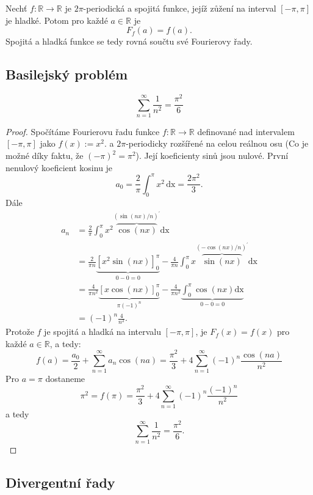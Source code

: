 \documentclass[../main.tex]{subfiles}
\begin{document}
\begin{consequence}
    Nechť $f:\mathbb{R}\to\mathbb{R}$ je $2\pi$-periodická a spojitá funkce, jejíž
    zůžení na interval $[-\pi,\pi]$ je hladké. Potom pro každé $a\in\mathbb{R}$ je
    \[ F_f(a) = f(a). \]
    Spojitá a hladká funkce se tedy rovná součtu své Fourierovy řady.
\end{consequence}

\subsection{Basilejský problém}

\begin{theorem}
    \[ \sum_{n=1}^{\infty} \frac{1}{n^2} = \frac{\pi^2}{6} \]
\end{theorem}
\begin{proof}
    Spočítáme Fourierovu řadu funkce $f:\mathbb{R}\to\mathbb{R}$ definované nad intervalem $[-\pi,\pi]$ jako
    $f(x) := x^2$. a $2\pi$-periodicky rozšířené na celou reálnou osu (Co je možné díky faktu, že $(-\pi)^2 = \pi^2$).
    Její koeficienty sinů jsou nulové. První nenulový koeficient kosinu je
    \[ a_0 = \frac{2}{\pi}\int_{0}^{\pi}x^2\,\text{dx} = \frac{2\pi^2}{3}.\]
    Dále
    $$
    \begin{aligned}
    a_n & =\frac{2}{\pi} \int_0^\pi x^2 \overbrace{\cos (n x)}^{(\sin (n x) / n)^{\prime}} \mathrm{dx} \\
    & =\frac{2}{\pi n} \underbrace{\left[x^2 \sin (n x)\right]_0^\pi}_{0-0=0}-\frac{4}{\pi n} \int_0^\pi x \overbrace{\sin (n x)}^{(-\cos (n x) / n)^{\prime}} \mathrm{dx} \\
    & =\frac{4}{\pi n^2} \underbrace{[x \cos (n x)]_0^\pi}_{\pi(-1)^n}-\frac{4}{\pi n^2} \underbrace{\int_0^\pi \cos (n x) \mathrm{dx}}_{0-0=0} \\
    & =(-1)^n \frac{4}{n^2} .
    \end{aligned}
    $$
    Protože $f$ je spojitá a hladká na intervalu $[-\pi,\pi]$, je $F_f(x) = f(x)$ 
    pro každé $a \in \mathbb{R}$, a tedy:
    $$
    f(a)=\frac{a_0}{2}+\sum_{n=1}^{\infty} a_n \cos (n a)=\frac{\pi^2}{3}+4 \sum_{n=1}^{\infty}(-1)^n \frac{\cos (n a)}{n^2}
    $$  
    Pro $a = \pi$ dostaneme
    $$
    \pi^2 = f(\pi)=\frac{\pi^2}{3}+4 \sum_{n=1}^{\infty}(-1)^n \frac{(-1)^n}{n^2}
    $$
    a tedy
    $$
    \sum_{n=1}^{\infty} \frac{1}{n^2}=\frac{\pi^2}{6}.
    $$
\end{proof}

\subsection{Divergentní řady}
\end{document}

